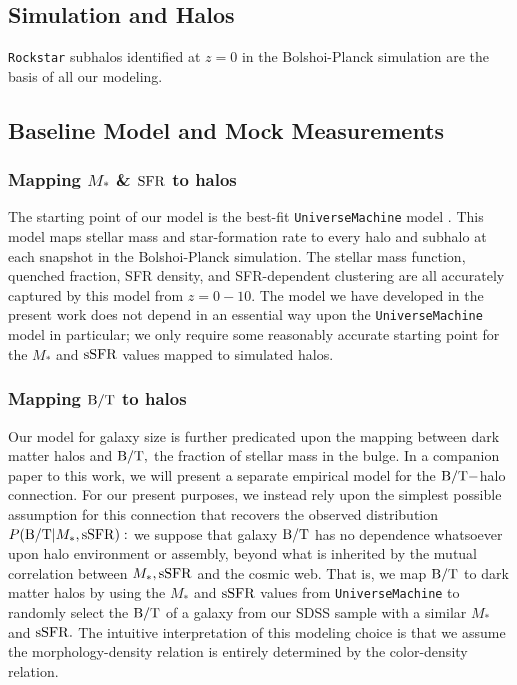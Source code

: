 \documentclass[usenatbib,usegraphicx,letterpaper]{mn2e}
\newcommand{\bt}{{\rm B/T}}
\newcommand{\mstar}{M_{\ast}}
\newcommand{\ssfr}{{\rm sSFR}}
\newcommand{\sfr}{{\rm SFR}}
\begin{document}
\subsection{Simulation and Halos}
\label{subsec:sim}

{\tt Rockstar} subhalos identified at $z=0$ in the Bolshoi-Planck simulation are the basis of all our modeling.

\subsection{Baseline Model and Mock Measurements}
\label{subsec:baselinemock}

\subsubsection{Mapping $\mstar$ \& $\sfr$ to halos}
\label{subsubsec:umachine}

The starting point of our model is the best-fit {\tt UniverseMachine} model \citep[][in prep]{behroozi_etal17}. This model maps stellar mass and star-formation rate to every halo and subhalo at each snapshot in the Bolshoi-Planck simulation. The stellar mass function, quenched fraction, SFR density, and SFR-dependent clustering are all accurately captured by this model from $z=0-10.$ The model we have developed in the present work does not depend in an essential way upon the {\tt UniverseMachine} model in particular; we only require some reasonably accurate starting point for the $\mstar$ and $\ssfr$ values mapped to simulated halos.

\subsubsection{Mapping $\bt$ to halos}
\label{subsubsec:random_bt_model}

Our model for galaxy size is further predicated upon the mapping between dark matter halos and $\bt,$ the fraction of stellar mass in the bulge. In a companion paper to this work, we will present a separate empirical model for the $\bt-$halo connection. For our present purposes, we instead rely upon the simplest possible assumption for this connection that recovers the observed distribution $P(\bt\vert\mstar,\ssfr):$ we suppose that galaxy $\bt$ has no dependence whatsoever upon halo environment or assembly, beyond what is inherited by the mutual correlation between $\mstar, \ssfr$ and the cosmic web. That is, we map $\bt$ to dark matter halos by using the $\mstar$ and $\ssfr$ values from {\tt UniverseMachine} to randomly select the $\bt$ of a galaxy from our SDSS sample with a similar $\mstar$ and $\ssfr.$ The intuitive interpretation of this modeling choice is that we assume the morphology-density relation is entirely determined by the color-density relation.
\end{document}
